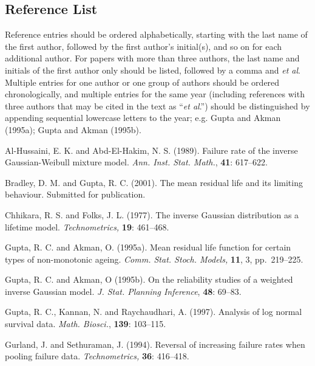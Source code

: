 \documentclass{IJCS_template}
\begin{document}
{\subsection*{Reference List}
Reference entries should be ordered alphabetically, starting with the
last name of the first author, followed by the first author's
initial(s), and so on for each additional author. For papers with more
than three authors, the last name and initials of the first author
only should be listed, followed by a comma and {\it et al}.  Multiple
entries for one author or one group of authors should be ordered
chronologically, and multiple entries for the same year (including
references with three authors that may be cited in the text as
``{\it et al}.'') should be distinguished by appending sequential
lowercase letters to the year; e.g. Gupta and Akman (1995a);
Gupta and Akman (1995b).

\begin{thebibliography}
Al-Hussaini, E. K. and Abd-El-Hakim, N. S. (1989). Failure rate of the
inverse Gaussian-Weibull mixture model. {\it Ann. Inst. Stat. Math.},
{\bf 41}: 617--622.

Bradley, D. M. and Gupta, R. C. (2001). The mean residual life and
its limiting behaviour. Submitted for publication.

Chhikara, R. S. and Folks, J. L. (1977). The inverse Gaussian
distribution as a lifetime model. {\it Technometrics,} {\bf 19}:
461--468.

Gupta, R. C. and Akman, O. (1995a). Mean residual life function
for certain types of non-monotonic ageing.
{\it Comm. Stat. Stoch. Models,} {\bf 11}, 3, pp.~219--225.

Gupta, R. C. and Akman, O (1995b). On the reliability studies of a
weighted inverse Gaussian model. {\it J. Stat. Planning Inference},
{\bf 48}: 69--83.

Gupta, R. C., Kannan, N. and Raychaudhari, A. (1997). Analysis of
log normal survival data. {\it Math. Biosci.}, {\bf 139}: 103--115.

Gurland, J. and Sethuraman, J. (1994). Reversal of increasing
failure rates when pooling failure data. {\it Technometrics,}
{\bf 36}: 416--418.


\end{thebibliography}}
\end{document}
